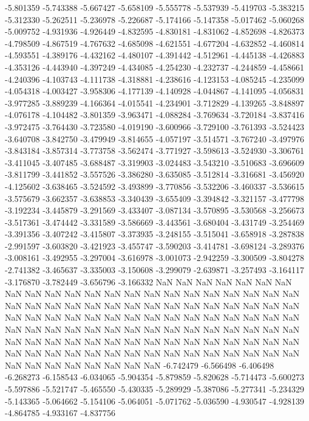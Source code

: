 -5.801359
-5.743388
-5.667427
-5.658109
-5.555778
-5.537939
-5.419703
-5.383215
-5.312330
-5.262511
-5.236978
-5.226687
-5.174166
-5.147358
-5.017462
-5.060268
-5.009752
-4.931936
-4.926449
-4.832595
-4.830181
-4.831062
-4.852698
-4.826373
-4.798509
-4.867519
-4.767632
-4.685098
-4.621551
-4.677204
-4.632852
-4.460814
-4.593551
-4.389176
-4.432162
-4.480107
-4.391442
-4.512961
-4.445138
-4.426883
-4.353126
-4.443940
-4.397249
-4.434085
-4.254230
-4.232737
-4.244859
-4.458661
-4.240396
-4.103743
-4.111738
-4.318881
-4.238616
-4.123153
-4.085245
-4.235099
-4.054318
-4.003427
-3.958306
-4.177139
-4.140928
-4.044867
-4.141095
-4.056831
-3.977285
-3.889239
-4.166364
-4.015541
-4.234901
-3.712829
-4.139265
-3.848897
-4.076178
-4.104482
-3.801359
-3.963471
-4.088284
-3.769634
-3.720184
-3.837416
-3.972475
-3.764430
-3.723580
-4.019190
-3.600966
-3.729100
-3.761393
-3.524423
-3.640708
-3.842750
-3.479949
-3.814655
-4.057197
-3.514571
-3.767240
-3.497976
-3.843184
-3.857314
-3.773758
-3.562474
-3.771927
-3.598613
-3.524930
-3.306761
-3.411045
-3.407485
-3.688487
-3.319903
-3.024483
-3.543210
-3.510683
-3.696609
-3.811799
-3.441852
-3.557526
-3.386280
-3.635085
-3.512814
-3.316681
-3.456920
-4.125602
-3.638465
-3.524592
-3.493899
-3.770856
-3.532206
-3.460337
-3.536615
-3.575679
-3.662357
-3.638853
-3.340439
-3.655409
-3.394842
-3.321157
-3.477798
-3.192234
-3.445879
-3.291569
-3.433407
-3.087134
-3.570895
-3.530568
-3.256673
-3.517361
-3.474442
-3.331589
-3.586669
-3.443561
-3.680404
-3.431749
-3.254469
-3.391356
-3.407242
-3.415807
-3.373935
-3.248155
-3.515041
-3.658918
-3.287838
-2.991597
-3.603820
-3.421923
-3.455747
-3.590203
-3.414781
-3.698124
-3.289376
-3.008161
-3.492955
-3.297004
-3.616978
-3.001073
-2.942259
-3.300509
-3.804278
-2.741382
-3.465637
-3.335003
-3.150608
-3.299079
-2.639871
-3.257493
-3.164117
-3.176870
-3.782449
-3.656796
-3.166332
NaN
NaN
NaN
NaN
NaN
NaN
NaN
NaN
NaN
NaN
NaN
NaN
NaN
NaN
NaN
NaN
NaN
NaN
NaN
NaN
NaN
NaN
NaN
NaN
NaN
NaN
NaN
NaN
NaN
NaN
NaN
NaN
NaN
NaN
NaN
NaN
NaN
NaN
NaN
NaN
NaN
NaN
NaN
NaN
NaN
NaN
NaN
NaN
NaN
NaN
NaN
NaN
NaN
NaN
NaN
NaN
NaN
NaN
NaN
NaN
NaN
NaN
NaN
NaN
NaN
NaN
NaN
NaN
NaN
NaN
NaN
NaN
NaN
NaN
NaN
NaN
NaN
NaN
NaN
NaN
NaN
NaN
NaN
NaN
NaN
NaN
NaN
NaN
NaN
NaN
NaN
NaN
NaN
NaN
NaN
NaN
NaN
NaN
NaN
NaN
NaN
NaN
NaN
NaN
NaN
-6.742479
-6.566498
-6.406498
-6.268273
-6.158543
-6.034065
-5.904354
-5.879859
-5.820628
-5.714473
-5.600273
-5.597886
-5.521747
-5.465550
-5.430335
-5.289929
-5.387086
-5.277341
-5.234329
-5.143365
-5.064662
-5.154106
-5.064051
-5.071762
-5.036590
-4.930547
-4.928139
-4.864785
-4.933167
-4.837756
